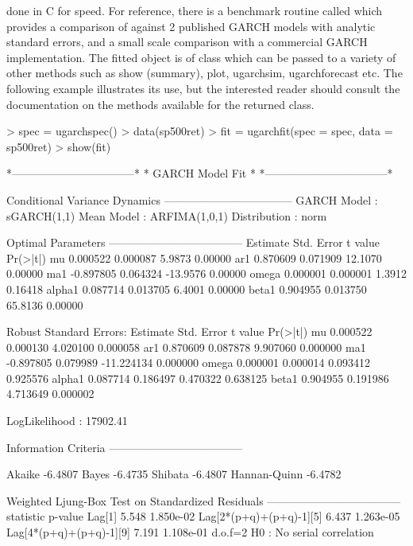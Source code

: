 done in C for speed. For reference, there is a benchmark routine called \verb@ugarchbench@
which provides a comparison of \verb@rugarch@ against 2 published GARCH models with analytic
standard errors, and a small scale comparison with a commercial GARCH implementation.
The fitted object is of class \verb@uGARCHfit@ which can be passed to a variety
of other methods such as show (summary), plot, ugarchsim, ugarchforecast etc.
The following example illustrates its use, but the interested reader should
consult the documentation on the methods available for the returned class.
\begin{Schunk}
\begin{Sinput}
> spec = ugarchspec()
> data(sp500ret)
> fit = ugarchfit(spec = spec, data = sp500ret)
> show(fit)
\end{Sinput}
\begin{Soutput}
*---------------------------------*
*          GARCH Model Fit        *
*---------------------------------*

Conditional Variance Dynamics
-----------------------------------
GARCH Model	: sGARCH(1,1)
Mean Model	: ARFIMA(1,0,1)
Distribution	: norm

Optimal Parameters
------------------------------------
        Estimate  Std. Error  t value Pr(>|t|)
mu      0.000522    0.000087   5.9873  0.00000
ar1     0.870609    0.071909  12.1070  0.00000
ma1    -0.897805    0.064324 -13.9576  0.00000
omega   0.000001    0.000001   1.3912  0.16418
alpha1  0.087714    0.013705   6.4001  0.00000
beta1   0.904955    0.013750  65.8136  0.00000

Robust Standard Errors:
        Estimate  Std. Error    t value Pr(>|t|)
mu      0.000522    0.000130   4.020100 0.000058
ar1     0.870609    0.087878   9.907060 0.000000
ma1    -0.897805    0.079989 -11.224134 0.000000
omega   0.000001    0.000014   0.093412 0.925576
alpha1  0.087714    0.186497   0.470322 0.638125
beta1   0.904955    0.191986   4.713649 0.000002

LogLikelihood : 17902.41

Information Criteria
------------------------------------

Akaike       -6.4807
Bayes        -6.4735
Shibata      -6.4807
Hannan-Quinn -6.4782

Weighted Ljung-Box Test on Standardized Residuals
------------------------------------
                        statistic   p-value
Lag[1]                      5.548 1.850e-02
Lag[2*(p+q)+(p+q)-1][5]     6.437 1.263e-05
Lag[4*(p+q)+(p+q)-1][9]     7.191 1.108e-01
d.o.f=2
H0 : No serial correlation


\end{Soutput}
\end{Schunk}
